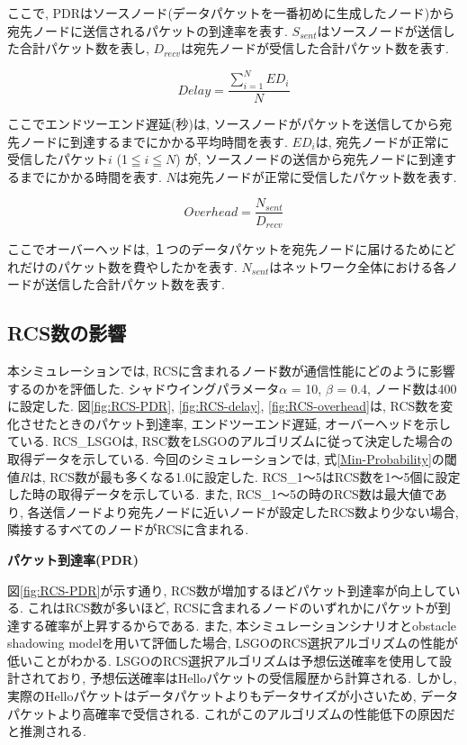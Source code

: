 \documentclass[10pt]{jreport}
\begin{document}
ここで, PDRはソースノード(データパケットを一番初めに生成したノード)から宛先ノードに送信されるパケットの到達率を表す. $S_{sent}$はソースノードが送信した合計パケット数を表し, $D_{recv}$は宛先ノードが受信した合計パケット数を表す.

\begin{equation}
	\label{delay}
	Delay = \frac{\sum_{i=1}^{N}ED_i}{N}
\end{equation}

ここでエンドツーエンド遅延(秒)は, ソースノードがパケットを送信してから宛先ノードに到達するまでにかかる平均時間を表す. $ED_i$は, 宛先ノードが正常に受信したパケット$i$ (1$ \leqq $$i$$ \leqq $$N$) が, ソースノードの送信から宛先ノードに到達するまでにかかる時間を表す. 
$N$は宛先ノードが正常に受信したパケット数を表す.

\begin{equation}
	\label{overhead}
	Overhead = \frac{N_{sent}}{  D_{recv}  }
\end{equation}

ここでオーバーヘッドは, １つのデータパケットを宛先ノードに届けるためにどれだけのパケット数を費やしたかを表す. $N_{sent}$はネットワーク全体における各ノードが送信した合計パケット数を表す.

\subsection{RCS数の影響}
本シミュレーションでは, RCSに含まれるノード数が通信性能にどのように影響するのかを評価した.
シャドウイングパラメータ$\alpha$ = 10, $\beta$ = 0.4, ノード数は400に設定した.
図\ref{fig:RCS-PDR}, \ref{fig:RCS-delay}, \ref{fig:RCS-overhead}は, RCS数を変化させたときのパケット到達率, エンドツーエンド遅延, オーバーヘッドを示している. RCS\_LSGOは, RSC数をLSGOのアルゴリズムに従って決定した場合の取得データを示している. 今回のシミュレーションでは, 式\ref{Min-Probability}の閾値$R$は, RCS数が最も多くなる1.0に設定した. RCS\_1～5はRCS数を1～5個に設定した時の取得データを示している. また, RCS\_1～5の時のRCS数は最大値であり, 各送信ノードより宛先ノードに近いノードが設定したRCS数より少ない場合, 隣接するすべてのノードがRCSに含まれる.
\par
\vspace{5mm}
\noindent
\textbf{パケット到達率(PDR)}
\vspace{5mm}


図\ref{fig:RCS-PDR}が示す通り, RCS数が増加するほどパケット到達率が向上している. これはRCS数が多いほど, RCSに含まれるノードのいずれかにパケットが到達する確率が上昇するからである. また, 本シミュレーションシナリオとobstacle shadowing modelを用いて評価した場合, LSGOのRCS選択アルゴリズムの性能が低いことがわかる. LSGOのRCS選択アルゴリズムは予想伝送確率を使用して設計されており, 予想伝送確率はHelloパケットの受信履歴から計算される. しかし, 実際のHelloパケットはデータパケットよりもデータサイズが小さいため, データパケットより高確率で受信される. これがこのアルゴリズムの性能低下の原因だと推測される.
\end{document}
